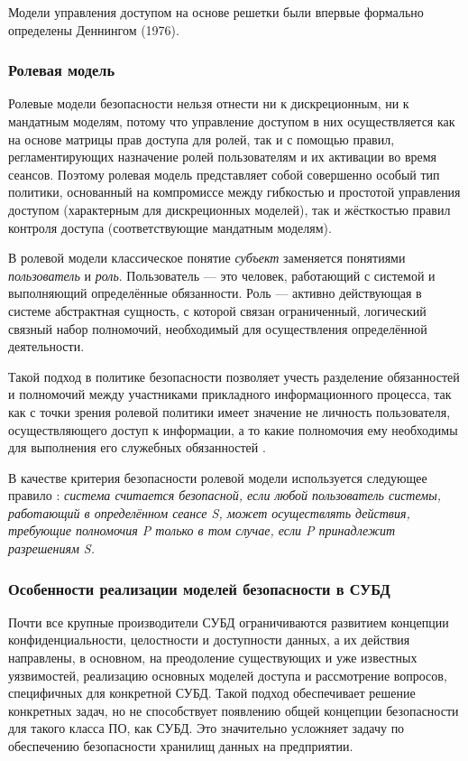 Модели управления доступом на основе решетки были впервые формально определены Деннингом (1976).

\subsubsection{Ролевая модель}

Ролевые модели безопасности нельзя отнести ни к дискреционным, ни к мандатным моделям, потому что
управление доступом в них осуществляется как на основе матрицы прав доступа для ролей, так и с помощью
правил, регламентирующих назначение ролей пользователям и их активации во время сеансов. Поэтому
ролевая модель представляет собой совершенно особый тип политики, основанный на компромиссе между
гибкостью и простотой управления доступом (характерным для дискреционных моделей), так и жёсткостью
правил контроля доступа (соответствующие мандатным моделям).

В ролевой модели классическое понятие \textit{субъект} заменяется понятиями \textit{пользователь} и
\textit{роль}. Пользователь --- это человек, работающий с системой и выполняющий определённые
обязанности. Роль --- активно действующая в системе абстрактная сущность, с которой связан
ограниченный, логический связный набор полномочий, необходимый для осуществления определённой деятельности.

Такой подход в политике безопасности позволяет учесть разделение обязанностей и полномочий между
участниками прикладного информационного процесса, так как с точки зрения ролевой политики имеет
значение не личность пользователя, осуществляющего доступ к информации, а то какие полномочия ему
необходимы для выполнения его служебных обязанностей \autocite{Zegzhda}.

В качестве критерия безопасности ролевой модели используется следующее правило \autocite{Zegzhda}:
\textit{система считается безопасной, если любой пользователь системы, работающий в определённом
сеансе S, может осуществлять действия, требующие полномочия P только в том случае, если P принадлежит
разрешениям S.}

\subsubsection{Особенности реализации моделей безопасности в СУБД}

Почти все крупные производители СУБД ограничиваются развитием концепции конфиденциальности, целостности
и доступности данных, а их действия направлены, в основном, на преодоление существующих и уже известных
уязвимостей, реализацию основных моделей доступа и рассмотрение вопросов, специфичных для конкретной СУБД.
Такой подход обеспечивает решение конкретных задач, но не способствует появлению общей концепции
безопасности для такого класса ПО, как СУБД. Это значительно усложняет задачу по обеспечению безопасности
хранилищ данных на предприятии.

